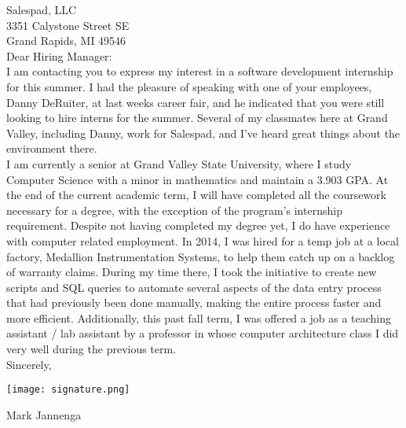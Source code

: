 \documentclass{article}
\begin{document}
	\hfill						%

	\hfill

	Salespad, LLC\\
	3351 Calystone Street SE\\
	Grand Rapids, MI 49546\\

	Dear Hiring Manager:\\

	I am contacting you to express my interest in a software development internship for this summer. I had the pleasure of speaking with one of your employees, Danny DeRuiter, at last weeks career fair, and he indicated that you were still looking to hire interns for the summer. Several of my classmates here at Grand Valley, including Danny, work for Salespad, and I've heard great things about the environment there.\\

	I am currently a senior at Grand Valley State University, where I study Computer Science with a minor in mathematics and maintain a 3.903 GPA. At the end of the current academic term, I will have completed all the coursework necessary for a degree, with the exception of the program's internship requirement. Despite not having completed my degree yet, I do have experience with computer related employment. In 2014, I was hired for a temp job at a local factory, Medallion Instrumentation Systems, to help them catch up on a backlog of warranty claims. During my time there, I took the initiative to create new scripts and SQL queries to automate several aspects of the data entry process that had previously been done manually, making the entire process faster and more efficient. Additionally, this past fall term, I was offered a job as a teaching assistant / lab assistant by a professor in whose computer architecture class I did very well during the previous term.\\


	

	Sincerely,

	\texttt{[image: signature.png]}

	Mark Jannenga
\end{document}
